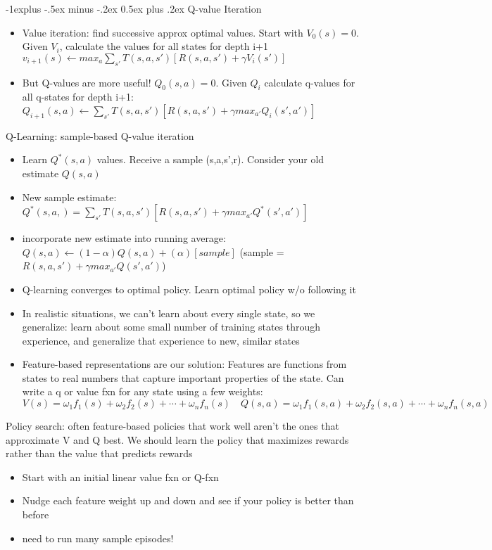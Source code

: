 \documentclass[10pt]{article}
\makeatletter
\renewcommand{\subsection}{\@startsection{subsection}{2}{0mm}%
                                {-1explus -.5ex minus -.2ex}%
                                {0.5ex plus .2ex}%
                                {\normalfont\normalsize\bfseries}}
\makeatother
\begin{document}
\begin{multicols*}{2}
\subsection{Q-value Iteration}
	\begin{itemize}
		\item Value iteration: find successive approx optimal values. Start with $V_0(s)=0$. Given $V_i$, calculate the values for all states for depth i+1 $v_{i+1}(s)\leftarrow max_a \displaystyle\sum_{s'}T(s,a,s')[R(s,a,s')+\gamma V_i(s')]$
		\item But Q-values are more useful! $Q_0(s,a)=0$. Given $Q_i$ calculate q-values for all q-states for depth i+1: $Q_{i+1}(s,a)\leftarrow \displaystyle\sum_{s'}T(s,a,s')[R(s,a,s')+\gamma max_{a'}Q_i(s',a')]$
	\end{itemize}
	Q-Learning: sample-based Q-value iteration
	\begin{itemize}
		\item Learn $Q^*(s,a)$ values. Receive a sample (s,a,s',r). Consider your old estimate $Q(s,a)$
		\item New sample estimate: $Q^*(s,a,)=\displaystyle\sum_{s'}T(s,a,s')[R(s,a,s')+\gamma max_{a'}Q^*(s',a')]$ 
		\item incorporate new estimate into running average: $Q(s,a)\leftarrow (1-\alpha)Q(s,a)+(\alpha)[sample]$ (sample = $R(s,a,s')+\gamma max_{a'}Q(s',a')$)
		\item Q-learning converges to optimal policy. Learn optimal policy w/o following it
		\item In realistic situations, we can't learn about every single state, so we generalize: learn about some small number of training states through experience, and generalize that experience to new, similar states
		\item Feature-based representations are our solution: Features are functions from states to real numbers that capture important properties of the state.
		Can write a q or value fxn for any state using a few weights: $V(s)=\omega_1f_1(s)+\omega_2f_2(s)+\cdots+\omega_nf_n(s) \quad Q(s,a) = \omega_1f_1(s,a)+\omega_2f_2(s,a)+\cdots+\omega_nf_n(s,a)$
		\end{itemize}

	Policy search: often feature-based policies that work well aren't the ones that approximate V and Q best. We should learn the policy that maximizes rewards rather than the value that predicts rewards
	\begin{itemize}
		\item Start with an initial linear value fxn or Q-fxn
		\item Nudge each feature weight up and down and see if your policy is better than before
		\item need to run many sample episodes!
	\end{itemize}
	

\end{multicols*}
\end{document}
